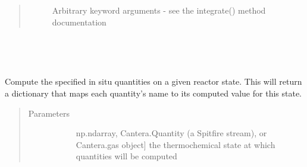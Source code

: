 \documentclass[letterpaper,10pt,english]{sphinxmanual}
\begin{document}
\begin{fulllineitems}
\begin{fulllineitems}
\begin{quote}
\begin{description}
\begin{description}
\item[{}] \leavevmode
Arbitrary keyword arguments - see the integrate() method documentation

\end{description}

\end{description}\end{quote}

\end{fulllineitems}


\begin{fulllineitems}
\label{\detokenize{spitfire.chemistry.reactors:spitfire.chemistry.reactors.HomogeneousReactor.n_reactions}}~
\end{fulllineitems}


\begin{fulllineitems}
\label{\detokenize{spitfire.chemistry.reactors:spitfire.chemistry.reactors.HomogeneousReactor.n_species}}~
\end{fulllineitems}


\begin{fulllineitems}
\label{\detokenize{spitfire.chemistry.reactors:spitfire.chemistry.reactors.HomogeneousReactor.process_quantities_on_state}}
Compute the specified in situ quantities on a given reactor state.
This will return a dictionary that maps each quantity’s name to its computed value for this state.
\begin{quote}\begin{description}
\item[{Parameters}] \leavevmode\begin{description}
\item[{}] \leavevmode{[}np.ndarray, Cantera.Quantity (a Spitfire stream), or Cantera.gas object{]}
the thermochemical state at which quantities will be computed


\end{description}
\end{description}
\end{quote}
\end{fulllineitems}
\end{fulllineitems}
\end{document}
